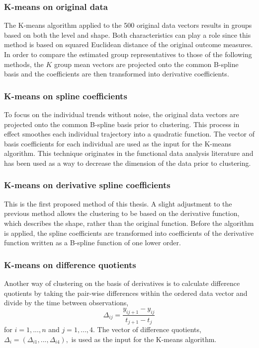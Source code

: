 \subsubsection{K-means on original data}
The K-means algorithm applied to the 500 original data vectors results in groups based on both the level and shape. Both characteristics can play a role since this method is based on squared Euclidean distance of the original outcome measures. In order to compare the estimated group representatives to those of the following methods, the $K$ group mean vectors are projected onto the common B-spline basis and the coefficients are then transformed into derivative coefficients.  

\subsubsection{K-means on spline coefficients}
To focus on the individual trends without noise, the original data vectors are projected onto the common B-spline basis prior to clustering. This process in effect smoothes each individual trajectory into a quadratic function. The vector of basis coefficients for each individual are used as the input for the K-means algorithm. This technique originates in the functional data analysis literature \cite{ramsay2005} and has been used as a way to decrease the dimension of the data prior to clustering. 

\subsubsection{K-means on derivative spline coefficients}
This is the first proposed method of this thesis. A slight adjustment to the previous method allows the clustering to be based on the derivative function, which describes the shape, rather than the original function. Before the algorithm is applied, the spline coefficients are transformed into coefficients of the derivative function written as a B-spline function of one lower order. 

\subsubsection{K-means on difference quotients}
Another way of clustering on the basis of derivatives is to calculate difference quotients by taking the pair-wise differences within the ordered data vector and divide by the time between observations,
$$\Delta_{ij} = \frac{y_{ij+1}-y_{ij}}{t_{j+1}-t_{j}}$$
for $i=1,...,n$ and $j=1,...,4$. The vector of difference quotients, $\Delta_{i}=(\Delta_{i1},...,\Delta_{i4}),$ is used as the input for the K-means algorithm.

